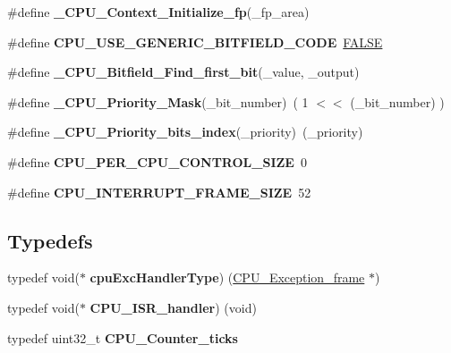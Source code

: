 \begin{DoxyCompactItemize}
\item 
\#define {\bfseries \+\_\+\+C\+P\+U\+\_\+\+Context\+\_\+\+Initialize\+\_\+fp}(\+\_\+fp\+\_\+area)
\item 
\mbox{\label{group__RTEMSScoreCPUi386_gab0aff7a561b9c030a4d88eff201f4688}} 
\#define {\bfseries C\+P\+U\+\_\+\+U\+S\+E\+\_\+\+G\+E\+N\+E\+R\+I\+C\+\_\+\+B\+I\+T\+F\+I\+E\+L\+D\+\_\+\+C\+O\+DE}~\mbox{\hyperlink{group__RTEMSScoreBaseDefs_gaa93f0eb578d23995850d61f7d61c55c1}{F\+A\+L\+SE}}
\item 
\#define {\bfseries \+\_\+\+C\+P\+U\+\_\+\+Bitfield\+\_\+\+Find\+\_\+first\+\_\+bit}(\+\_\+value,  \+\_\+output)
\item 
\mbox{\label{group__RTEMSScoreCPUi386_gab2b14ff6bbccff7e0a99f55c4c8b8e87}} 
\#define {\bfseries \+\_\+\+C\+P\+U\+\_\+\+Priority\+\_\+\+Mask}(\+\_\+bit\+\_\+number)~( 1 $<$$<$ (\+\_\+bit\+\_\+number) )
\item 
\mbox{\label{group__RTEMSScoreCPUi386_ga806e09db1107cf84732edffb7c7f96b2}} 
\#define {\bfseries \+\_\+\+C\+P\+U\+\_\+\+Priority\+\_\+bits\+\_\+index}(\+\_\+priority)~(\+\_\+priority)
\item 
\mbox{\label{group__RTEMSScoreCPUi386_gaf8e38596ad3db49995fd8eb9fb4e86b2}} 
\#define {\bfseries C\+P\+U\+\_\+\+P\+E\+R\+\_\+\+C\+P\+U\+\_\+\+C\+O\+N\+T\+R\+O\+L\+\_\+\+S\+I\+ZE}~0
\item 
\mbox{\label{group__RTEMSScoreCPUi386_gac17ddadf3ff0907a3beefb6d72b1563f}} 
\#define {\bfseries C\+P\+U\+\_\+\+I\+N\+T\+E\+R\+R\+U\+P\+T\+\_\+\+F\+R\+A\+M\+E\+\_\+\+S\+I\+ZE}~52
\end{DoxyCompactItemize}
\subsection*{Typedefs}
\begin{DoxyCompactItemize}
\item 
\mbox{\label{group__RTEMSScoreCPUi386_gaeaf54ae304c9c7d2d2e7ddd85cc110c7}} 
typedef void($\ast$ {\bfseries cpu\+Exc\+Handler\+Type}) (\mbox{\hyperlink{structCPU__Exception__frame}{C\+P\+U\+\_\+\+Exception\+\_\+frame}} $\ast$)
\item 
\mbox{\label{group__RTEMSScoreCPUi386_gac905d5415fa56674b259d97f4ea46e5c}} 
typedef void($\ast$ {\bfseries C\+P\+U\+\_\+\+I\+S\+R\+\_\+handler}) (void)
\item 
\mbox{\label{group__RTEMSScoreCPUi386_ga67f8550aad58bccb6fcb4589894444ad}} 
typedef uint32\+\_\+t {\bfseries C\+P\+U\+\_\+\+Counter\+\_\+ticks}
\end{DoxyCompactItemize}
